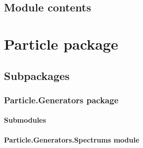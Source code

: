 \documentclass[letterpaper,10pt,english]{sphinxmanual}
\begin{document}
\subsection{Module contents}
\label{\detokenize{Medium:module-contents}}
\sphinxstepscope


\section{Particle package}
\label{\detokenize{Particle:particle-package}}\label{\detokenize{Particle::doc}}

\subsection{Subpackages}
\label{\detokenize{Particle:subpackages}}
\sphinxstepscope


\subsubsection{Particle.Generators package}
\label{\detokenize{Particle.Generators:particle-generators-package}}\label{\detokenize{Particle.Generators::doc}}

\paragraph{Submodules}
\label{\detokenize{Particle.Generators:submodules}}

\paragraph{Particle.Generators.Spectrums module}
\label{\detokenize{Particle.Generators:module-Particle.Generators.Spectrums}}\label{\detokenize{Particle.Generators:particle-generators-spectrums-module}}
\end{document}

